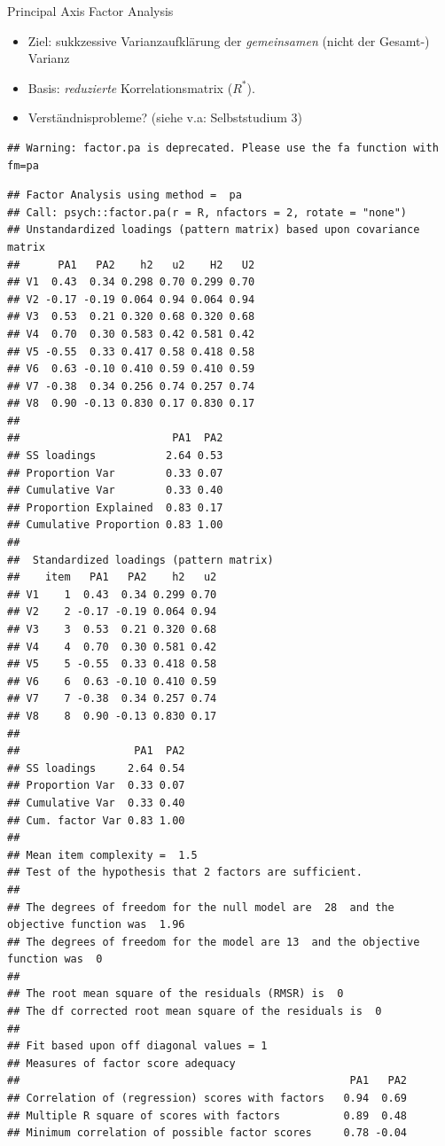 \documentclass[
  ignorenonframetext,
]{beamer}
\providecommand{\tightlist}{%
  \setlength{\itemsep}{0pt}\setlength{\parskip}{0pt}}
\begin{document}
\begin{frame}[fragile]{Principal Axis Factor Analysis}
\protect\hypertarget{principal-axis-factor-analysis}{}
\begin{itemize}
\tightlist
\item
  Ziel: sukkzessive Varianzaufklärung der \emph{gemeinsamen} (nicht der
  Gesamt-) Varianz
\item
  Basis: \emph{reduzierte} Korrelationsmatrix (\(R^*\)).
\item
  Verständnisprobleme? (siehe v.a: Selbststudium 3)
\end{itemize}

\begin{verbatim}
## Warning: factor.pa is deprecated. Please use the fa function with fm=pa
\end{verbatim}

\begin{verbatim}
## Factor Analysis using method =  pa
## Call: psych::factor.pa(r = R, nfactors = 2, rotate = "none")
## Unstandardized loadings (pattern matrix) based upon covariance matrix
##      PA1   PA2    h2   u2    H2   U2
## V1  0.43  0.34 0.298 0.70 0.299 0.70
## V2 -0.17 -0.19 0.064 0.94 0.064 0.94
## V3  0.53  0.21 0.320 0.68 0.320 0.68
## V4  0.70  0.30 0.583 0.42 0.581 0.42
## V5 -0.55  0.33 0.417 0.58 0.418 0.58
## V6  0.63 -0.10 0.410 0.59 0.410 0.59
## V7 -0.38  0.34 0.256 0.74 0.257 0.74
## V8  0.90 -0.13 0.830 0.17 0.830 0.17
## 
##                        PA1  PA2
## SS loadings           2.64 0.53
## Proportion Var        0.33 0.07
## Cumulative Var        0.33 0.40
## Proportion Explained  0.83 0.17
## Cumulative Proportion 0.83 1.00
## 
##  Standardized loadings (pattern matrix)
##    item   PA1   PA2    h2   u2
## V1    1  0.43  0.34 0.299 0.70
## V2    2 -0.17 -0.19 0.064 0.94
## V3    3  0.53  0.21 0.320 0.68
## V4    4  0.70  0.30 0.581 0.42
## V5    5 -0.55  0.33 0.418 0.58
## V6    6  0.63 -0.10 0.410 0.59
## V7    7 -0.38  0.34 0.257 0.74
## V8    8  0.90 -0.13 0.830 0.17
## 
##                  PA1  PA2
## SS loadings     2.64 0.54
## Proportion Var  0.33 0.07
## Cumulative Var  0.33 0.40
## Cum. factor Var 0.83 1.00
## 
## Mean item complexity =  1.5
## Test of the hypothesis that 2 factors are sufficient.
## 
## The degrees of freedom for the null model are  28  and the objective function was  1.96
## The degrees of freedom for the model are 13  and the objective function was  0 
## 
## The root mean square of the residuals (RMSR) is  0 
## The df corrected root mean square of the residuals is  0 
## 
## Fit based upon off diagonal values = 1
## Measures of factor score adequacy             
##                                                    PA1   PA2
## Correlation of (regression) scores with factors   0.94  0.69
## Multiple R square of scores with factors          0.89  0.48
## Minimum correlation of possible factor scores     0.78 -0.04
\end{verbatim}
\end{frame}
\end{document}
